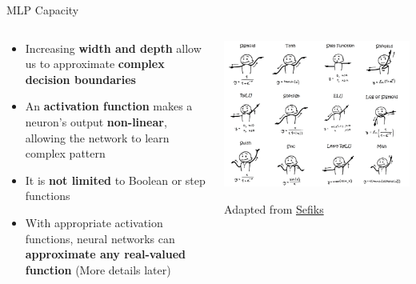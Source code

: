 \documentclass[serif, aspectratio=169]{beamer}
\begin{document}
\begin{frame}{MLP Capacity}
	\begin{columns}
		\begin{column}{0.6\textwidth}
			\begin{itemize}
				\item Increasing \textbf{width and depth} allow us to approximate \textbf{complex decision boundaries}
				\item An \textbf{activation function} makes a neuron’s output \textbf{non-linear}, allowing the network to learn complex pattern
				\item It is \textbf{not limited} to Boolean or step functions
				\item With appropriate activation functions, neural networks can \textbf{approximate any real-valued function} (More details later)
			\end{itemize}
		\end{column}
		\begin{column}{0.4\textwidth}
			\includegraphics[width=\textwidth]{pic/2/activations.png} \\
			\begin{center}
				{\scriptsize Adapted from \href{https://sefiks.com/2020/02/02/dance-moves-of-deep-learning-activation-functions/}{Sefiks}}
			\end{center}
		\end{column}
	\end{columns}
\end{frame}


\end{document}
